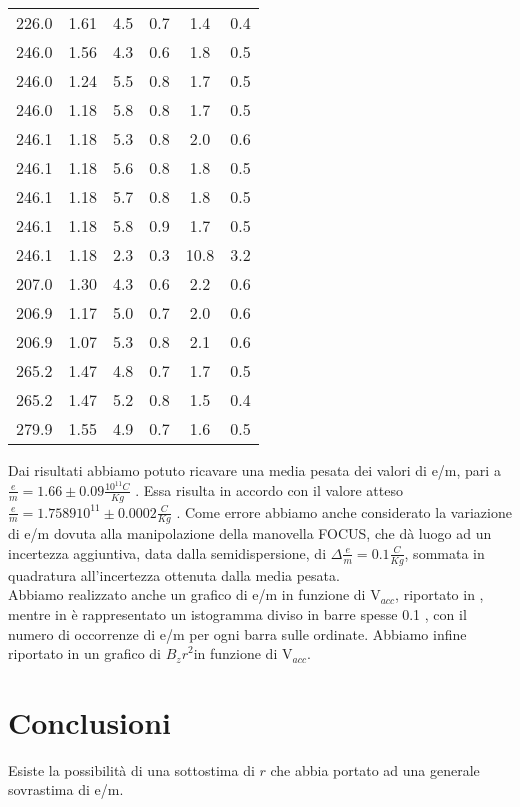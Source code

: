 \begin{table}[h]
\begin{tabular}{*{6}{S[table-figures-exponent = 2]} }
		226.0 & 1.61 & 4.5 & 0.7 & 1.4 & 0.4\\ 
		246.0 & 1.56 & 4.3 & 0.6 & 1.8 & 0.5\\ 
		246.0 & 1.24 & 5.5 & 0.8 & 1.7 & 0.5\\ 
		246.0 & 1.18 & 5.8 & 0.8 & 1.7 & 0.5\\ 
		246.1 & 1.18 & 5.3 & 0.8 & 2.0 & 0.6\\ 
		246.1 & 1.18 & 5.6 & 0.8 & 1.8 & 0.5\\ 
		246.1 & 1.18 & 5.7 & 0.8 & 1.8 & 0.5\\ 
		246.1 & 1.18 & 5.8 & 0.9 & 1.7 & 0.5\\ 
		246.1 & 1.18 & 2.3 & 0.3 & 10.8 & 3.2\\ 
		207.0 & 1.30 & 4.3 & 0.6 & 2.2 & 0.6\\ 
		206.9 & 1.17 & 5.0 & 0.7 & 2.0 & 0.6\\ 
		206.9 & 1.07 & 5.3 & 0.8 & 2.1 & 0.6\\ 
		265.2 & 1.47 & 4.8 & 0.7 & 1.7 & 0.5\\ 
		265.2 & 1.47 & 5.2 & 0.8 & 1.5 & 0.4\\ 
		279.9 & 1.55 & 4.9 & 0.7 & 1.6 & 0.5\\ 
  
 	\end{tabular}
	\caption{ }
	\label{t:tabella2}
\end{table}
Dai risultati abbiamo potuto ricavare una media pesata dei valori di e/m, pari a $\frac{e}{m} = 1.66 \pm 0.09 \frac{10^{11} C}{Kg}$ . Essa risulta in accordo con il valore atteso $\frac{e}{m} = 1.7589 10^11 \pm 0.0002 \frac{C}{Kg}$ . Come errore abbiamo anche considerato la variazione di e/m dovuta alla manipolazione della manovella FOCUS, che dà luogo ad un incertezza aggiuntiva, data dalla semidispersione, di $\Delta \frac{e}{m} = 0.1 \frac{C}{Kg}$, sommata in quadratura all'incertezza ottenuta dalla media pesata.\\
Abbiamo realizzato anche un grafico di e/m in funzione di V$_{acc}$, riportato in , mentre in  è rappresentato un istogramma diviso in barre spesse 0.1 , con il numero di occorrenze di e/m per ogni barra sulle ordinate. Abbiamo infine riportato in  un grafico di ${B_z r}^2$in funzione di V$_{acc}$.

\section{Conclusioni}
Esiste la possibilità di una sottostima di $r$ che abbia portato ad una generale sovrastima di e/m.